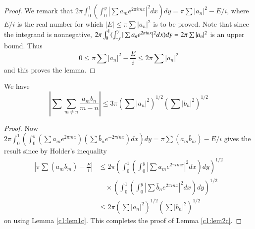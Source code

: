 \begin{proof}
We remark that $2\pi \int^1_0 \left(\int^y_0 | \sum a_m e^{2\pi i mx}
|^2 dx \right) dy = \pi \sum |a_n|^2 - E/i$, where $E/i$  is the real
number for which $|E| \leq \pi \sum |a_n|^2$ is to be proved. Note
that since the integrand is nonnegative, $2\pi \int^1_0 (\int^y_{-y} |
\sum a_n e^{2\pi i nx}|^2 dx)\break dy = 2\pi \sum |a_n|^2$ is an upper
bound. Thus 
$$
0 \leq \pi \sum |a_n|^2 - \frac{E}{i} \leq 2 \pi \sum |a_n|^2
$$
and this proves the lemma.
\end{proof}

\begin{lem}\label{c1:lem2c}
We have
$$
\left|\sum  \sum\limits_{m \neq n} \frac{a_m \bar{b}_n}{m -n}\right| \leq 3\pi \left( \sum |a_n|^2 \right)^{1/2} \left( \sum |b_n|^2\right)^{1/2}
$$
\end{lem}

\begin{proof}
Now\pageoriginale $2\pi \int^1_0 (\int^y_0 (\sum a_m e^{2\pi mx}) (\sum \bar{b}_{n} e^{-2\pi i nx})dx) dy = \pi \sum (a_m \bar{b}_m) - E/i$ gives the result since by Holder's inequality
\begin{align*}
\left|\pi \sum (a_m \bar{b}_m) - \frac{E}{i} \right| & \leq 2 \pi \left( \int^1_0 \left(\int^y_0 | \sum a_m e^{2\pi i mx} |^2 dx \right) dy\right)^{1/2}\\
& \quad \times \left(\int^1_0 \left(\int^y_0 |\sum \bar{b}_n e^{2\pi i nx}|^2 dx \right) dy \right)^{1/2}\\
& \leq 2 \pi \left(\sum |a_n|^2 \right)^{1/2} \left(\sum |b_n|^2 \right)^{1/2}
\end{align*}
on using Lemma \ref{c1:lem1c}. This completes the proof of Lemma \ref{c1:lem2c}.
\end{proof}

